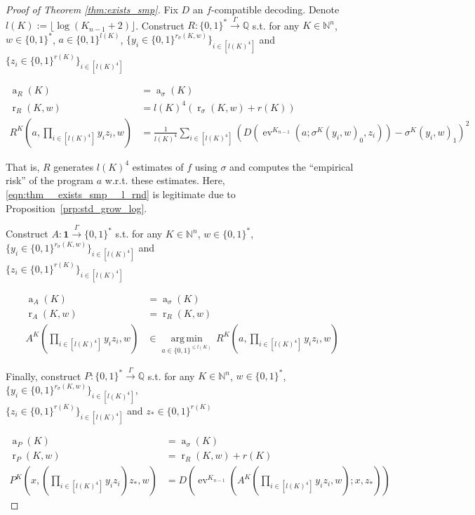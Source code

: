 \documentclass{article}
\numberwithin{equation}{section}
\theoremstyle{definition}
\theoremstyle{plain}
\newcommand{\Bool}{\{0,1\}}
\newcommand{\Words}{{\Bool^*}}
\DeclareMathOperator{\Ev}{ev}
\DeclareMathOperator{\R}{r}
\DeclareMathOperator{\A}{a}
\newcommand{\Argmin}[1]{\underset{#1}{\operatorname{arg\,min}}\,}
\newcommand{\Nats}{\mathbb{N}}
\newcommand{\Rats}{\mathbb{Q}}
\newcommand{\Floor}[1]{\lfloor #1 \rfloor}
\newcommand{\Scheme}{\xrightarrow{\Gamma}}
\begin{document}
\begin{proof}[Proof of Theorem \ref{thm:exists_smp}]

Fix ${D}$ an ${f}$-compatible decoding. Denote\\ ${l(K):=\Floor{\log (K_{n-1} + 2)}}$. Construct ${R: \Words \Scheme \Rats}$ s.t. for any ${K \in \Nats^n}$, $w \in \Words$, ${a \in \Bool^{l(K)}}$, ${\{y_i \in \Bool^{r_\sigma(K,w)}\}_{i \in [l(K)^4]}}$ and ${\{z_i \in \Bool^{r(K)}\}_{i \in [l(K)^4]}}$

\begin{align}
\label{eqn:thm__exists_smp__l_adv}\A_R(K) &= \A_\sigma(K) \\
\label{eqn:thm__exists_smp__l_rnd}\R_R(K,w) &= l(K)^4 (\R_\sigma(K,w) + r(K)) \\
\label{eqn:thm__exists_smp__l_alg}R^K(a,\prod_{i \in [l(K)^4]}y_i z_i,w) &= \frac{1}{l(K)^4}\sum_{i \in [l(K)^4]}(D(\Ev^{K_{n-1}}(a;\sigma^K(y_i,w)_0,z_i))-\sigma^K(y_i,w)_1)^2 
\end{align}

That is, ${R}$ generates ${l(K)^4}$ estimates of ${f}$ using ${\sigma}$ and computes the \enquote{empirical risk} of the program ${a}$ w.r.t. these estimates. Here, \ref{eqn:thm__exists_smp__l_rnd} is legitimate due to Proposition~\ref{prp:std_grow_log}. 

Construct ${A: \bm{1} \Scheme \Words}$ s.t. for any ${K \in \Nats^n}$, ${w \in \Words}$, ${\{y_i \in \Bool^{r_\sigma(K,w)}\}_{i \in [l(K)^4]}}$ and\\ ${\{z_i \in \Bool^{r(K)}\}_{i \in [l(K)^4]}}$

\begin{align}
\label{eqn:thm__exists_smp__a_adv}\A_A(K) &= \A_\sigma(K) \\
\label{eqn:thm__exists_smp__a_rnd}\R_A(K,w) &= \R_R(K,w) \\
\label{eqn:thm__exists_smp__a_alg}A^K(\prod_{i \in [l(K)^4]}y_i z_i,w) &\in \Argmin{a \in \Bool^{\leq l(K)}} R^K(a,\prod_{i \in [l(K)^4]}y_i z_i,w)
\end{align}

Finally, construct ${P: \Words \Scheme \Rats}$ s.t. for any ${K \in \Nats^n}$, ${w \in \Words}$, ${\{y_i \in \Bool^{r_\sigma(K,w)}\}_{i \in [l(K)^4]}}$,\\ ${\{z_i \in \Bool^{r(K)}\}_{i \in [l(K)^4]}}$ and ${z_* \in \Bool^{r(K)}}$

\begin{align}
\label{eqn:thm__exists_smp__p_adv}\A_P(K) &= \A_\sigma(K) \\
\label{eqn:thm__exists_smp__p_rnd}\R_P(K,w) &= \R_R(K,w) + r(K) \\
\label{eqn:thm__exists_smp__p_alg}P^K(x,(\prod_{i \in [l(K)^4]}y_i z_i)z_{*},w) &= D(\Ev^{K_{n-1}}(A^K(\prod_{i \in [l(K)^4]}y_i z_i,w);x,z_{*}))
\end{align}


\end{proof}
\end{document}

